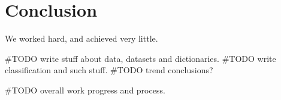 \chapter{Conclusion}\label{conclusions}
We worked hard, and achieved very little.


#TODO write stuff about data, datasets and dictionaries.
#TODO write classification and such stuff. 
#TODO trend conclusions?

#TODO overall work progress and process. 


